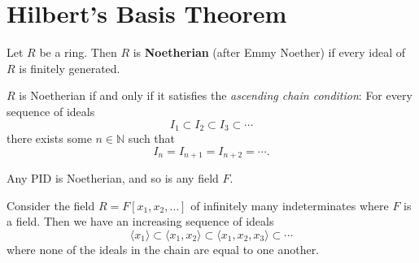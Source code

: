 \section{Hilbert's Basis Theorem}

\begin{definition}
Let $R$ be a ring. Then $R$ is \textbf{Noetherian} (after Emmy Noether) if every ideal of $R$ is finitely generated.
\end{definition}
\begin{proposition}
$R$ is Noetherian if and only if it satisfies the \textit{ascending chain condition}: For every sequence of ideals
\[I_1 \subset I_2 \subset I_3 \subset \cdots\] there exists some $n \in \mathbb{N}$ such that 
\[I_n = I_{n + 1} = I_{n + 2} = \cdots.\]
\end{proposition}

\begin{example}
Any PID is Noetherian, and so is any field $F$.
\end{example}
\begin{example}
Consider the field $R = F[x_1, x_2, \dots]$ of infinitely many indeterminates where $F$ is a field. Then we have an increasing sequence of ideals
\[\langle x_1 \rangle \subset \langle x_1, x_2 \rangle \subset \langle x_1, x_2, x_3 \rangle \subset \cdots\]
where none of the ideals in the chain are equal to one another.
\end{example}

